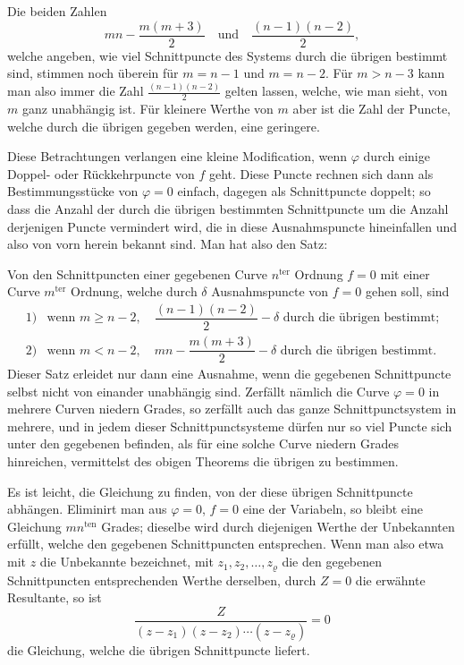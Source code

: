\documentclass[10pt]{article}
\begin{document}
Die beiden Zahlen
\[
mn-\frac{m(m+3)}{2}
\quad\text{und}\quad
\frac{(n-1)(n-2)}{2},
\]
welche angeben, wie viel Schnittpuncte des Systems durch die übrigen bestimmt sind, stimmen noch überein für $m=n-1$ und $m=n-2$. Für $m>n-3$ kann man also immer die Zahl $\frac{(n-1)(n-2)}{2}$ gelten lassen, welche, wie man sieht, von $m$ ganz unabhängig ist. Für kleinere Werthe von $m$ aber ist die Zahl der Puncte, welche durch die übrigen gegeben werden, eine geringere.

Diese Betrachtungen verlangen eine kleine Modification, wenn $\varphi$ durch einige Doppel- oder Rückkehrpuncte von $f$ geht. Diese Puncte rechnen sich dann als Bestimmungsstücke von $\varphi=0$ einfach, dagegen als Schnittpuncte doppelt; so dass die Anzahl der durch die übrigen bestimmten Schnittpuncte um die Anzahl derjenigen Puncte vermindert wird, die in diese Ausnahmspuncte hineinfallen und also von vorn herein bekannt sind. Man hat also den Satz:

Von den Schnittpuncten einer gegebenen Curve $n^{\text{ter}}$ Ordnung $f=0$ mit einer Curve $m^{\text{ter}}$ Ordnung, welche durch $\delta$ Ausnahmspuncte von $f=0$ gehen soll, sind
\[
\begin{array}{ll}
1) & \text{wenn }m\geq n-2,\quad \dfrac{(n-1)(n-2)}{2}-\delta\text{ durch die übrigen bestimmt;}\\[0.4em]
2) & \text{wenn }m<n-2,\quad mn-\dfrac{m(m+3)}{2}-\delta\text{ durch die übrigen bestimmt.}
\end{array}
\]
Dieser Satz erleidet nur dann eine Ausnahme, wenn die gegebenen Schnittpuncte selbst nicht von einander unabhängig sind. Zerfällt nämlich die Curve $\varphi=0$ in mehrere Curven niedern Grades, so zerfällt auch das ganze Schnittpunctsystem in mehrere, und in jedem dieser Schnittpunctsysteme dürfen nur so viel Puncte sich unter den gegebenen befinden, als für eine solche Curve niedern Grades hinreichen, vermittelst des obigen Theorems die übrigen zu bestimmen.

Es ist leicht, die Gleichung zu finden, von der diese übrigen Schnittpuncte abhängen. Eliminirt man aus $\varphi=0$, $f=0$ eine der Variabeln, so bleibt eine Gleichung $mn^{\text{ten}}$ Grades; dieselbe wird durch diejenigen Werthe der Unbekannten erfüllt, welche den gegebenen Schnittpuncten entsprechen. Wenn man also etwa mit $z$ die Unbekannte bezeichnet, mit $z_1,z_2,\ldots,z_{\varrho}$ die den gegebenen Schnittpuncten entsprechenden Werthe derselben, durch $Z=0$ die erwähnte Resultante, so ist
\[
\frac{Z}{(z-z_1)(z-z_2)\cdots(z-z_{\varrho})}=0
\]
die Gleichung, welche die übrigen Schnittpuncte liefert.
\end{document}
